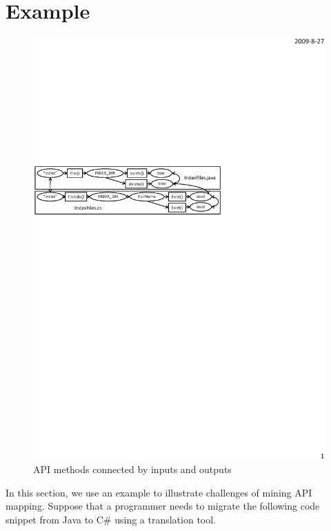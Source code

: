 \section{Example}
\label{sec:example}

\begin{figure}[t]
\centering
\includegraphics[scale=0.8,clip]{figure/dataflow.eps}\vspace*{-3ex}
 \caption
{\label{fig:dataflow}API methods connected by inputs and
outputs}\vspace*{-3ex}
\end{figure}

In this section, we use an example to illustrate challenges of
mining API mapping. Suppose that a programmer needs to migrate the
following code snippet from Java to C\# using a translation tool.


